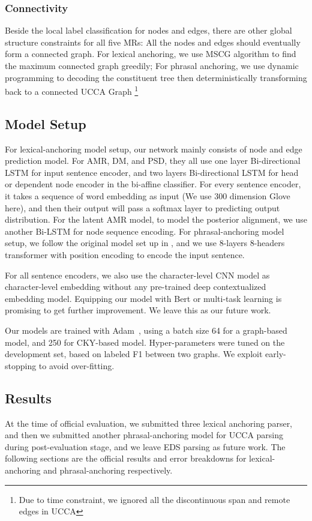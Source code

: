 \subsubsection{Connectivity}
\label{sssec:lex:connectivity}

Beside the local label classification for
nodes and edges, there are other global structure constraints for all
five MRs: All the nodes and edges should eventually form a connected
graph. For lexical anchoring, we use MSCG algorithm to find the
maximum connected graph greedily; For phrasal anchoring, we use
dynamic programming to decoding the constituent tree then
deterministically transforming back to a connected UCCA Graph
\footnote{Due to time
  constraint, we ignored all the discontinuous span and remote edges
  in UCCA}

\subsection{Model Setup}
\label{ssec:exp_setup}

For lexical-anchoring model setup, our network mainly consists of node
and edge prediction model. For AMR, DM, and PSD, they all use one
layer Bi-directional LSTM for input sentence encoder, and two layers
Bi-directional LSTM for head or dependent node encoder in the
bi-affine classifier. For every sentence encoder, it takes a sequence
of word embedding as input (We use 300 dimension Glove here), and then
their output will pass a softmax layer to predicting output
distribution. For the latent AMR model, to model the posterior
alignment, we use another Bi-LSTM for node sequence encoding. For
phrasal-anchoring model setup, we follow the original model set up in
\citet{kitaev2018constituency}, and we use 8-layers 8-headers
transformer with position encoding to encode the input sentence.

For all sentence encoders, we also use the character-level CNN model
as character-level embedding without any pre-trained deep
contextualized embedding model. Equipping our model with Bert or
multi-task learning is promising to get further improvement. We leave
this as our future work.

Our models are trained with Adam~\cite{kingma2014adam}, using a batch
size 64 for a graph-based model, and 250 for CKY-based
model. Hyper-parameters were tuned on the development set, based on
labeled F1 between two graphs. We exploit early-stopping to avoid
over-fitting.

\subsection{Results}
\label{ssec:results}
At the time of official evaluation, we submitted three lexical
anchoring parser, and then we submitted another phrasal-anchoring
model for UCCA parsing during post-evaluation stage, and we leave EDS
parsing as future work. The following sections are the official
results and error breakdowns for lexical-anchoring and
phrasal-anchoring respectively.


